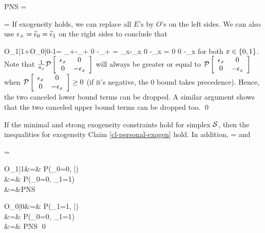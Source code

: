 \beq
PNS =
\eeq

\beq
\left[
\begin{array}{c}
E_{1|1}
\\
\\
E_{0|0}
\\
\\
O_{1,1}+ O_{0,0}
\\
\\
E_{1|1} + E_{0|0}
-O_{1,1}- O_{0,0}
\end{array}
\right]
=
\eeq
If exogeneity holds,
we can replace all $E$'s
by $O$'s on the left sides.
We can also use $\epsilon_+={\widehat{\epsilon}}_0=
{\widehat{\epsilon}}_1$
on the right sides to conclude that

\beq
O_{1|1}+O_{0|0}-1=
\Pmat{\eps_+}
{\eps_+-\eps_+}
{0}
{-\eps_+}
=
{\HAT{\eps}_x-\HAT{\eps}_x}
{0}
{-\HAT{\eps}_x}
=
{0}
{0}
{-\eps_x}
\eeq
for both $x\in\{0,1\}$.
Note that
$\frac{1}{\pi_x}{\cal P}\left[ \begin{array}{cc}\epsilon_x&0\\0&-\epsilon_x \end{array}\right]$
will always be greater or equal to
${\cal P}\left[ \begin{array}{cc}\epsilon_x&0\\0&-\epsilon_x \end{array}\right]$
when ${\cal P}\left[ \begin{array}{cc}\epsilon_x&0\\0&-\epsilon_x \end{array}\right]\geq 0$ (if it's
negative, the 0 bound takes precedence). Hence,
the two canceled lower bound terms
can be dropped.
A similar argument shows that the
two canceled upper bound terms
can be dropped too.
\qed



\begin{claim}
If the minimal and
strong exogeneity constraints
 hold for simplex ${\cal S}$,
then the inequalities
for exogeneity Claim \ref{cl-personal-exogen}
hold.
In addition,
\beq
\PN =
\eeq
and

\beq
\PS =
\eeq
\end{claim}
\proof
\beqa
\PN *O_{1|1}&=&
P(\rvy_0=0, |)
\\
&=&
P(\rvy_0=0, \rvy_1=1)
\\
&=&PNS
\eeqa

\beqa
\PS *O_{0|0}&=&
P(\rvy_1=1, |)
\\
&=&
P(\rvy_0=0, \rvy_1=1)
\\
&=& PNS
\eeqa
\qed



